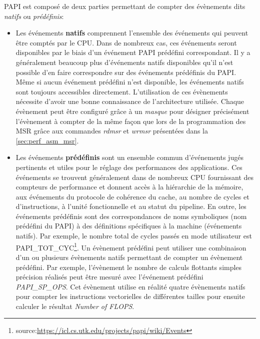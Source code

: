         
            PAPI est composé de deux parties permettant de compter des évènements dits \textit{natifs} ou \textit{prédéfinis}:
            \begin{itemize}
                \item Les événements \textbf{natifs} comprennent l'ensemble des événements qui peuvent être comptés par le CPU. Dans de nombreux cas, ces événements seront disponibles par le biais d'un événement PAPI prédéfini correspondant. Il y a généralement beaucoup plus d'événements natifs disponibles qu'il n'est possible d'en faire correspondre sur des événements prédéfinis du PAPI. Même si aucun événement prédéfini n'est disponible, les événements natifs sont toujours accessibles directement. L'utilisation de ces évènements nécessite d'avoir une bonne connaissance de l'architecture utilisée. Chaque évènement peut être configuré grâce à un \textit{masque} pour désigner précisément l'évènement à compter de la même façon que lors de la programmation des MSR grâce aux commandes \textit{rdmsr} et \textit{wrmsr} présentées dans la \autoref{sec:perf_asm_msr}. 
            
                \item Les événements \textbf{prédéfinis} sont un ensemble commun d'événements jugés pertinents et utiles pour le réglage des performances des applications. Ces événements se trouvent généralement dans de nombreux CPU fournissant des compteurs de performance et donnent accès à la hiérarchie de la mémoire, aux événements du protocole de cohérence du cache, au nombre de cycles et d'instructions, à l'unité fonctionnelle et au statut du pipeline. En outre, les événements prédéfinis sont des correspondances de noms symboliques (nom prédéfini du PAPI) à des définitions spécifiques à la machine (événements natifs). Par exemple, le nombre total de cycles passés en mode utilisateur est PAPI\_TOT\_CYC\footnote{source:\url{https://icl.cs.utk.edu/projects/papi/wiki/Events}}. Un évènement prédéfini peut utiliser une combinaison d'un ou plusieurs évènements natifs permettant de compter un évènement prédéfini. Par exemple, l'évènement le nombre de calculs flottants simples précision réalisés peut être mesuré avec l'événement prédéfini \textit{PAPI\_SP\_OPS}. Cet évènement utilise en réalité quatre évènements natifs pour compter les instructions vectorielles de différentes tailles pour ensuite calculer le résultat \textit{Number of FLOPS}.
            \end{itemize}
            
            

